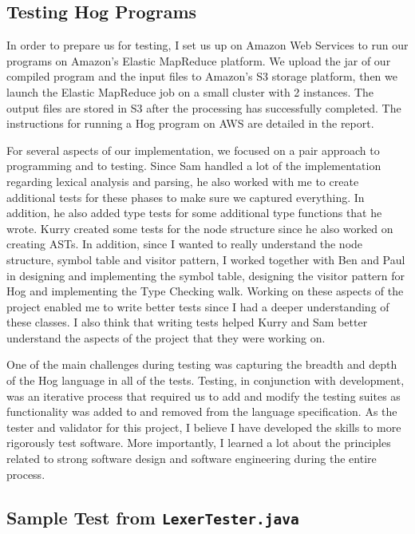 \documentclass{report}
\begin{document}
\subsection*{Testing Hog Programs}

In order to prepare us for testing, I set us up on Amazon Web Services to run our programs on Amazon’s Elastic MapReduce platform. We upload the jar of our compiled program and the input files to Amazon’s S3 storage platform, then we launch the Elastic MapReduce job on a small cluster with 2 instances. The output files are stored in S3 after the processing has successfully completed. The instructions for running a Hog program on AWS are detailed in the report.

For several aspects of our implementation, we focused on a pair approach to programming and to testing. Since Sam handled a lot of the implementation regarding lexical analysis and parsing, he also worked with me to create additional tests for these phases to make sure we captured everything. In addition, he also added type tests for some additional type functions that he wrote. Kurry created some tests for the node structure since he also worked on creating ASTs. In addition, since I wanted to really understand the node structure, symbol table and visitor pattern, I worked together with Ben and Paul in designing and implementing the symbol table, designing the visitor pattern for Hog and implementing the Type Checking walk. Working on these aspects of the project enabled me to write better tests since I had a deeper understanding of these classes. I also think that writing tests helped Kurry and Sam better understand the aspects of the project that they were working on. 

One of the main challenges during testing was capturing the breadth and depth of the Hog language in all of the tests. Testing, in conjunction with development, was an iterative process that required us to add and modify the testing suites as functionality was added to and removed from the language specification. As the tester and validator for this project, I believe I have developed the skills to more rigorously test software. More importantly, I learned a lot about the principles related to strong software design and software engineering during the entire process. 

\subsection*{Sample Test from \tt LexerTester.java\rm}
\end{document}
